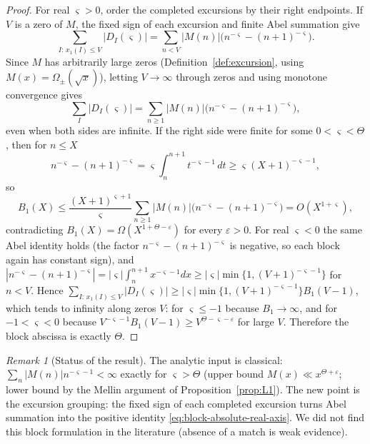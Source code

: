 \documentclass[11pt,reqno]{amsart}
\numberwithin{equation}{section}
\theoremstyle{plain}
\theoremstyle{definition}
\theoremstyle{remark}
\newtheorem{remark}[theorem]{Remark}
\newcommand{\eps}{\varepsilon}
\begin{document}
\begin{proof}
For real $\varsigma>0$, order the completed excursions by their right
endpoints.  If $V$ is a zero of $M$, the fixed sign of each excursion and
finite Abel summation give
\begin{equation}
 \sum_{I:\,x_1(I)\le V}|D_I(\varsigma)|
 =\sum_{n<V}|M(n)|
 \bigl(n^{-\varsigma}-(n+1)^{-\varsigma}\bigr).
\end{equation}
Since $M$ has arbitrarily large zeros (Definition~\ref{def:excursion},
using $M(x)=\Omega_\pm(\sqrt x)$), letting $V\to\infty$ through zeros and
using monotone convergence gives
\begin{equation}
\label{eq:block-absolute-real-axis}
 \sum_I|D_I(\varsigma)|
 =\sum_{n\ge1}|M(n)|
 \bigl(n^{-\varsigma}-(n+1)^{-\varsigma}\bigr),
\end{equation}
even when both sides are infinite.
If the right side were finite for some $0<\varsigma<\Theta$, then for
$n\le X$
\begin{equation}
 n^{-\varsigma}-(n+1)^{-\varsigma}
 =\varsigma\int_n^{n+1}t^{-\varsigma-1}\,dt
 \ge \varsigma(X+1)^{-\varsigma-1},
\end{equation}
so
\begin{equation}
 B_1(X)\le
 \frac{(X+1)^{\varsigma+1}}{\varsigma}
 \sum_{n\ge1}|M(n)|
 \bigl(n^{-\varsigma}-(n+1)^{-\varsigma}\bigr)
 =O(X^{1+\varsigma}),
\end{equation}
contradicting $B_1(X)=\Omega(X^{1+\Theta-\eps})$ for every $\eps>0$.
For real $\varsigma<0$ the same Abel identity holds (the factor
$n^{-\varsigma}-(n+1)^{-\varsigma}$ is negative, so each block again has
constant sign), and
$|n^{-\varsigma}-(n+1)^{-\varsigma}|=|\varsigma|\int_n^{n+1}x^{-\varsigma-1}dx
\ge|\varsigma|\min\{1,(V+1)^{-\varsigma-1}\}$ for $n<V$. Hence
$\sum_{I:\,x_1(I)\le V}|D_I(\varsigma)|\ge|\varsigma|\min\{1,(V+1)^{-\varsigma-1}\}
B_1(V-1)$, which tends to infinity along zeros $V$: for $\varsigma\le-1$ because
$B_1\to\infty$, and for $-1<\varsigma<0$ because
$V^{-\varsigma-1}B_1(V-1)\ge V^{\Theta-\varsigma-\eps}$ for large $V$.  Therefore the block abscissa is
exactly $\Theta$.
\end{proof}

\begin{remark}[Status of the result]
\label{rem:block-abscissa-status}
The analytic input is classical: $\sum_n|M(n)|n^{-\varsigma-1}<\infty$
exactly for $\varsigma>\Theta$ (upper bound $M(x)\ll x^{\Theta+\eps}$;
lower bound by the Mellin argument of Proposition~\ref{prop:L1}). The new
point is the excursion grouping: the fixed sign of each completed excursion
turns Abel summation into the positive identity
\eqref{eq:block-absolute-real-axis}. We did not find this block
formulation in the literature (absence of a match is weak evidence).
\end{remark}
\end{document}
